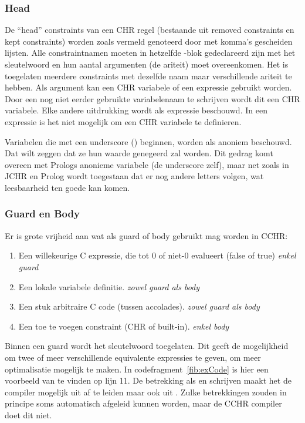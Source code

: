\subsubsection{Head}

De ``head'' constraints van een CHR regel (bestaande uit removed constraints en kept constraints) worden zoals vermeld genoteerd door met komma's gescheiden lijsten. Alle constraintnamen moeten in hetzelfde -blok gedeclareerd zijn met het  sleutelwoord en hun aantal argumenten (de ariteit) moet overeenkomen. Het is toegelaten meerdere constraints met dezelfde naam maar verschillende ariteit te hebben. Als argument kan een CHR variabele of een expressie gebruikt worden. Door een nog niet eerder gebruikte variabelenaam te schrijven wordt dit een CHR variabele. Elke andere uitdrukking wordt als expressie beschouwd. In een expressie is het niet mogelijk om een CHR variabele te definieren.

Variabelen die met een underscore (\code{\_}) beginnen, worden als anoniem beschouwd. Dat wilt zeggen dat ze hun waarde genegeerd zal worden. Dit gedrag komt overeen met Prologs anonieme variabele (de underscore zelf), maar net zoals in JCHR en Prolog wordt toegestaan dat er nog andere letters volgen, wat leesbaarheid ten goede kan komen.

\subsubsection{Guard en Body}

Er is grote vrijheid aan wat als guard of body gebruikt mag worden in CCHR: \begin{enumerate}
  \item Een willekeurige C expressie, die tot 0 of niet-0 evalueert (false of true) {\em enkel guard}
  \item Een lokale variabele definitie. {\em zowel guard als body}
  \item Een stuk arbitraire C code (tussen accolades). {\em zowel guard als body}
  \item Een toe te voegen constraint (CHR of built-in). {\em enkel body}
\end{enumerate}

Binnen een guard wordt het sleutelwoord  toegelaten. Dit geeft de mogelijkheid om twee of meer verschillende equivalente expressies te geven, om meer optimalisatie mogelijk te maken. In codefragment~\ref{fib:exCode} is hier een voorbeeld van te vinden op lijn 11. De betrekking als  en  schrijven maakt het de compiler mogelijk  uit  af te leiden maar ook  uit . Zulke betrekkingen zouden in principe soms automatisch afgeleid kunnen worden, maar de CCHR compiler doet dit niet.

